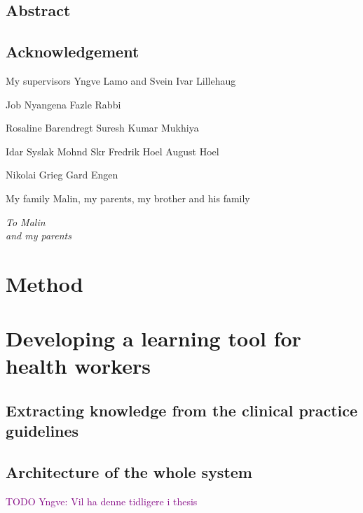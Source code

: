\documentclass[a4paper,12pt]{book}
\begin{document}
\frontmatter


\newpage
\section*{Abstract}
\newpage
\section*{Acknowledgement}
My supervisors Yngve Lamo and Svein Ivar Lillehaug

Job Nyangena
Fazle Rabbi

Rosaline Barendregt
Suresh Kumar Mukhiya

Idar Syslak
Mohnd Skr
Fredrik Hoel
August Hoel

Nikolai Grieg
Gard Engen

My family Malin, my parents, my brother and his family
\newpage
\begin{flushright}
	\null{}
	\itshape
	To Malin \\
	and my parents
	\null
\end{flushright}

\tableofcontents
\mainmatter





\chapter{Method}




\chapter{Developing a learning tool for health workers}
\section{Extracting knowledge from the clinical  practice guidelines}








\section{Architecture of the whole system}
\textcolor{purple}{TODO Yngve: Vil ha denne tidligere i thesis}
\end{document}
